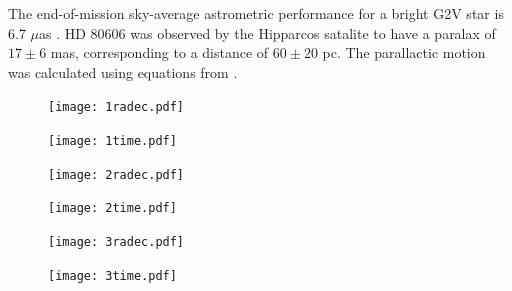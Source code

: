 \documentclass[preprint]{aastex}
\begin{document}
The end-of-mission sky-average astrometric performance for a bright G2V star is 6.7 $\mu$as \citep{gaia}. 
HD 80606 was observed by the Hipparcos satalite to have a paralax of $17\pm6$ mas, corresponding to a distance of $60\pm20$ pc. 
The parallactic motion was calculated using equations from \citet{parallax}.

\begin{figure}[h]
\begin{center}
    \texttt{[image: 1radec.pdf]}
    \caption{}
    \label{fig:1radec}
\end{center}
\end{figure}

\begin{figure}[h]
\begin{center}
    \texttt{[image: 1time.pdf]}
    \caption{}
    \label{fig:1time}
\end{center}
\end{figure}

\begin{figure}[h]
\begin{center}
    \texttt{[image: 2radec.pdf]}
    \caption{}
    \label{fig:2radec}
\end{center}
\end{figure}

\begin{figure}[h]
\begin{center}
    \texttt{[image: 2time.pdf]}
    \caption{}
    \label{fig:2time}
\end{center}
\end{figure}

\begin{figure}[h]
\begin{center}
    \texttt{[image: 3radec.pdf]}
    \caption{}
    \label{fig:3radec}
\end{center}
\end{figure}

\begin{figure}[h]
\begin{center}
    \texttt{[image: 3time.pdf]}
    \caption{}
    \label{fig:3time}
\end{center}
\end{figure}





\end{document}
